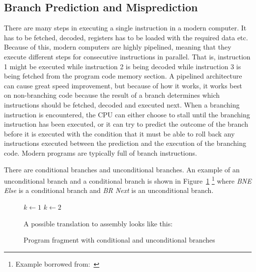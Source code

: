 \subsection{Branch Prediction and Misprediction}
There are many steps in executing a single instruction in a modern computer.
It has to be fetched, decoded, registers has to be loaded with the required data etc.
Because of this, modern computers are highly pipelined, meaning that they execute different steps for consecutive instructions in parallel.
That is, instruction 1 might be executed while instruction 2 is being decoded while instruction 3 is being fetched from the program code memory section.
A pipelined architecture can cause great speed improvement, but because of how it works, it works best on non-branching code because the result of a branch determines which instructions should be fetched, decoded and executed next.
When a branching instruction is encountered, the CPU can either choose to stall until the branching instruction has been executed, or it can try to predict the outcome of the branch before it is executed with the condition that it must be able to roll back any instructions executed between the prediction and the execution of the branching code.
Modern programs are typically full of branch instructions.

There are conditional branches and unconditional branches. 
An example of an unconditional branch and a conditional branch is shown in Figure~\ref{fig:branchexample} \footnote{Example borrowed from:~} where \textit{BNE Else} is a conditional branch and \textit{BR Next} is an unconditional branch.

\begin{figure}
\begin{algorithmic}
	\State $k \gets 1$
\Else
	\State $k \gets 2$
\EndIf
\end{algorithmic}
\vspace{0.3cm}
\noindent
A possible translation to assembly looks like this:
\vspace{0.3cm}
\begin{compactenum}
\item \itab{ }  
\item \itab{ }  
\item {}  
\item \itab{ }  
\item {}  
\item {}
\end{compactenum}
\caption{Program fragment with conditional and unconditional branches}
\label{fig:branchexample}
\end{figure}


